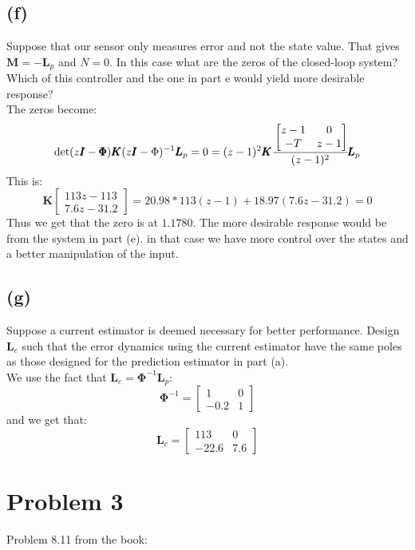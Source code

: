 \documentclass{article}
\begin{document}
\subsection*{(f)}
Suppose that our sensor only measures error and not the state value. That gives $\pmb{M}=-\pmb{L}_p$ and $N=0$. In this case what are the zeros of the closed-loop system? Which of this controller and the one in part e would yield more desirable response?\\
The zeros become:
\[\det(z\pmb{I}-\pmb{\Phi})\pmb{K}(z\pmb{I}-\Phi)^{-1}\pmb{L}_p=0=(z-1)^2\pmb{K}\cfrac{\begin{bmatrix}z-1&0\\-T&z-1\end{bmatrix}}{(z-1)^2}\pmb{L}_p\]
This is:
\[\pmb{K}\begin{bmatrix}113z-113\\7.6z-31.2\end{bmatrix}=20.98*113(z-1)+18.97(7.6z-31.2)=0\]
    Thus we get that the zero is at $1.1780$. The more desirable response would be from the system in part (e). in that case we have more control over the states and a better manipulation of the input.

\subsection*{(g)}
Suppose a current estimator is deemed necessary for better performance. Design $\pmb{L}_c$ such that the error dynamics using the current estimator have the same poles as those designed for the prediction estimator in part (a).\\
We use the fact that $\pmb{L}_c=\pmb{\Phi}^{-1}\pmb{L}_p$:
\[\pmb{\Phi}^{-1}=\begin{bmatrix}1&0\\-0.2&1\end{bmatrix}\]
and we get that:
\[\pmb{L}_c=\begin{bmatrix}113&0\\-22.6&7.6\end{bmatrix}\]

\section*{Problem 3}
Problem 8.11 from the book:
\end{document}
